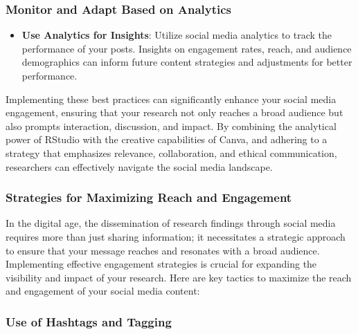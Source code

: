\documentclass[
]{book}
\providecommand{\tightlist}{%
  \setlength{\itemsep}{0pt}\setlength{\parskip}{0pt}}
\begin{document}
\hypertarget{monitor-and-adapt-based-on-analytics}{%
\subsubsection{Monitor and Adapt Based on Analytics}\label{monitor-and-adapt-based-on-analytics}}

\begin{itemize}
\tightlist
\item
  \textbf{Use Analytics for Insights}: Utilize social media analytics to track the performance of your posts. Insights on engagement rates, reach, and audience demographics can inform future content strategies and adjustments for better performance.
\end{itemize}

Implementing these best practices can significantly enhance your social media engagement, ensuring that your research not only reaches a broad audience but also prompts interaction, discussion, and impact. By combining the analytical power of RStudio with the creative capabilities of Canva, and adhering to a strategy that emphasizes relevance, collaboration, and ethical communication, researchers can effectively navigate the social media landscape.

\hypertarget{strategies-for-maximizing-reach-and-engagement}{%
\subsubsection*{Strategies for Maximizing Reach and Engagement}\label{strategies-for-maximizing-reach-and-engagement}}

In the digital age, the dissemination of research findings through social media requires more than just sharing information; it necessitates a strategic approach to ensure that your message reaches and resonates with a broad audience. Implementing effective engagement strategies is crucial for expanding the visibility and impact of your research. Here are key tactics to maximize the reach and engagement of your social media content:

\hypertarget{use-of-hashtags-and-tagging}{%
\subsubsection{Use of Hashtags and Tagging}\label{use-of-hashtags-and-tagging}}
\end{document}
